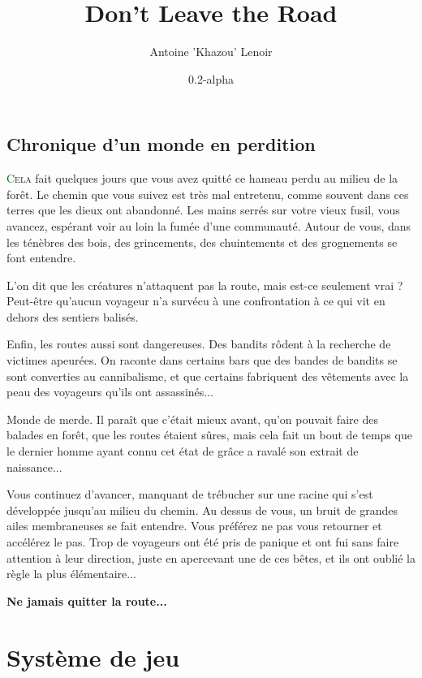 \documentclass[twoside,12pt,english]{book}
\title{Don't Leave the Road}
\author{Antoine 'Khazou' Lenoir}
\date{0.2-alpha}
\newcommand*\initfamily{\usefont{U}{Acorn}{xl}{n}}
\begin{document}

\maketitle

\section*{Chronique d'un monde en perdition}

\lettrine[lines=3]{\initfamily\textcolor{darkgreen}{C}}{ela} fait quelques jours que vous avez quitté ce hameau perdu au milieu de la forêt. Le chemin que vous suivez est très mal entretenu, comme souvent dans ces terres que les dieux ont abandonné. Les mains serrés sur votre vieux fusil, vous avancez, espérant voir au loin la fumée d'une communauté. Autour de vous, dans les ténèbres des bois, des grincements, des chuintements et des grognements se font entendre.

L'on dit que les créatures n'attaquent pas la route, mais est-ce seulement vrai ? Peut-être qu'aucun voyageur n'a survécu à une confrontation à ce qui vit en dehors des sentiers balisés.

Enfin, les routes aussi sont dangereuses. Des bandits rôdent à la recherche de victimes apeurées. On raconte dans certains bars que des bandes de bandits se sont converties au cannibalisme, et que certains fabriquent des vêtements avec la peau des voyageurs qu'ils ont assassinés...

Monde de merde. Il paraît que c'était mieux avant, qu'on pouvait faire des balades en forêt, que les routes étaient sûres, mais cela fait un bout de temps que le dernier homme ayant connu cet état de grâce a ravalé son extrait de naissance...

Vous continuez d'avancer, manquant de trébucher sur une racine qui s'est développée jusqu'au milieu du chemin. Au dessus de vous, un bruit de grandes ailes membraneuses se fait entendre. Vous préférez ne pas vous retourner et accélérez le pas. Trop de voyageurs ont été pris de panique et ont fui sans faire attention à leur direction, juste en apercevant une de ces bêtes, et ils ont oublié la règle la plus élémentaire...

\textbf{Ne jamais quitter la route...}

\tableofcontents

\chapter{Système de jeu}
\newpage
\end{document}
